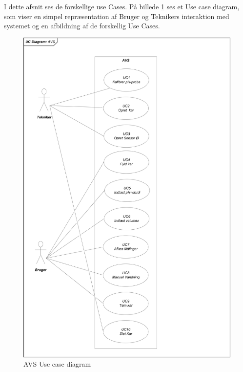 I dette afsnit ses de forskellige use Cases. På billede \ref{photo:UseCD} ses et Use case diagram, som viser en simpel repræsentation af Bruger og Teknikers interaktion med systemet og en afbildning af de forskellig Use Cases. 
\newline
\begin{figure}[H]
	\centering
	\includegraphics[scale=0.6]{Kravspecifikation/UseCases/Photo/AVS_UseCases}
	\caption{AVS Use case diagram}
	\label{photo:UseCD}
\end{figure}

\newpage